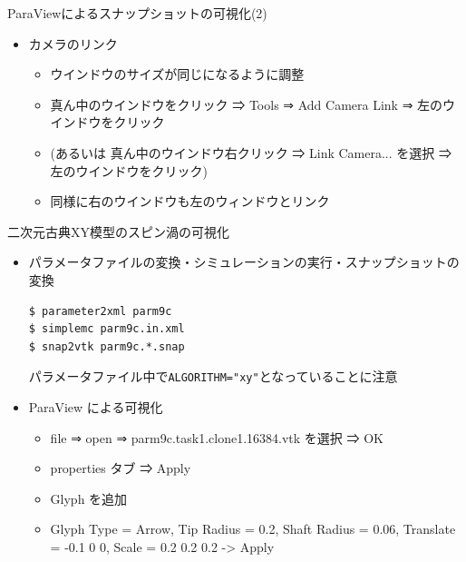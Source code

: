 \begin{frame}[t,fragile]{ParaViewによるスナップショットの可視化(2)}
  \begin{itemize}
  \item カメラのリンク
    \begin{itemize}
    \item ウインドウのサイズが同じになるように調整
    \item 真ん中のウインドウをクリック ⇒ Tools ⇒ Add Camera Link ⇒ 左のウインドウをクリック
    \item (あるいは 真ん中のウインドウ右クリック ⇒ Link Camera... を選択 ⇒ 左のウインドウをクリック)
    \item 同様に右のウインドウも左のウィンドウとリンク
    \end{itemize}
  \end{itemize}
\end{frame}

\begin{frame}[t,fragile]{二次元古典XY模型のスピン渦の可視化}
  \begin{itemize}
  \item パラメータファイルの変換・シミュレーションの実行・スナップショットの変換
\begin{lstlisting}
$ parameter2xml parm9c
$ simplemc parm9c.in.xml
$ snap2vtk parm9c.*.snap
\end{lstlisting}
パラメータファイル中で\verb+ALGORITHM="xy"+となっていることに注意
  \item ParaView による可視化
    \begin{itemize}
      \item file ⇒ open ⇒ parm9c.task1.clone1.16384.vtk を選択 ⇒ OK
      \item properties タブ ⇒ Apply
      \item Glyph を追加
      \item Glyph Type = Arrow, Tip Radius = 0.2, Shaft Radius = 0.06, Translate = -0.1 0 0, Scale = 0.2 0.2 0.2 -> Apply
    \end{itemize}
  \end{itemize}
\end{frame}

